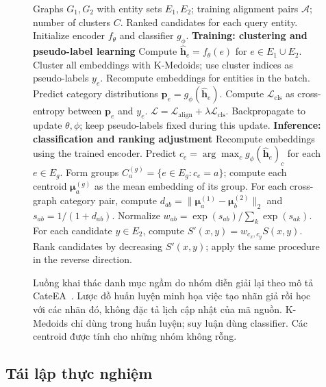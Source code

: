 \begin{figure}[t]
\footnotesize
\begin{algorithmic}[1]
\REQUIRE Graphs $G_1,G_2$ with entity sets $E_1,E_2$;
    training alignment pairs $\mathcal{A}$; number of clusters $C$.
\ENSURE Ranked candidates for each query entity.
\STATE Initialize encoder $f_\theta$ and classifier $g_\phi$.
\STATE \textbf{Training: clustering and pseudo-label learning}
\REPEAT
    \STATE Compute $\hat{\mathbf{h}}_e=f_\theta(e)$ for
        $e\in E_1\cup E_2$.
    \STATE Cluster all embeddings with K-Medoids;
        use cluster indices as pseudo-labels $y_e$.
        \STATE Recompute embeddings for entities in the batch.
        \STATE Predict category distributions
            $\mathbf{p}_e=g_\phi(\hat{\mathbf{h}}_e)$.
        \STATE Compute $\mathcal{L}_{\mathrm{cls}}$
            as cross-entropy between $\mathbf{p}_e$ and $y_e$.
        \STATE $\mathcal{L}=\mathcal{L}_{\mathrm{align}}
            +\lambda\mathcal{L}_{\mathrm{cls}}$.
        \STATE Backpropagate to update $\theta,\phi$;
            keep pseudo-labels fixed during this update.
    \ENDFOR
{}
\STATE \textbf{Inference: classification and ranking adjustment}
\STATE Recompute embeddings using the trained encoder.
    \STATE Predict $c_e=\arg\max_c g_\phi(
        \hat{\mathbf{h}}_e)_c$ for each $e\in E_g$.
    \STATE Form groups $C_a^{(g)}=\{e\in E_g:c_e=a\}$;
        compute each centroid $\boldsymbol{\mu}_a^{(g)}$
        as the mean embedding of its group.
\ENDFOR
\STATE For each cross-graph category pair, compute
    $d_{ab}=\|\boldsymbol{\mu}_a^{(1)}
    -\boldsymbol{\mu}_b^{(2)}\|_2$ and $s_{ab}=1/(1+d_{ab})$.
\STATE Normalize $w_{ab}=\exp(s_{ab})/\sum_k\exp(s_{ak})$.
    \STATE For each candidate $y\in E_2$, compute
        $S'(x,y)=w_{c_x,c_y}S(x,y)$.
    \STATE Rank candidates by decreasing $S'(x,y)$;
        apply the same procedure in the reverse direction.
\ENDFOR
\end{algorithmic}
\caption{Luồng khai thác danh mục ngầm do nhóm diễn giải lại
    theo mô tả CateEA~\cite{feng-etal-2025-cateea}.
    Lược đồ huấn luyện minh họa việc tạo nhãn giả rồi học với
    các nhãn đó, không đặc tả lịch cập nhật của mã nguồn.
    K-Medoids chỉ dùng trong huấn luyện; suy luận dùng classifier.
    Các centroid được tính cho những nhóm không rỗng.}
\label{alg:cateea}
\end{figure}
\subsection{Tái lập thực nghiệm}


